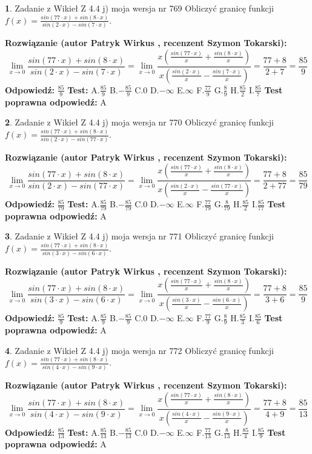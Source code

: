 \documentclass[12pt, a4paper]{article}
\theoremstyle{definition} %
\newtheorem{zad}{}
\newcommand{\zadStart}[1]{\begin{zad}#1\newline}
\newcommand{\zadStop}{\end{zad}}
\newcommand{\rozwStart}[2]{\noindent \textbf{Rozwiązanie (autor #1 , recenzent #2): }\newline}
\newcommand{\rozwStop}{\newline}
\newcommand{\odpStart}{\noindent \textbf{Odpowiedź:}\newline}
\newcommand{\odpStop}{\newline}
\newcommand{\testStart}{\noindent \textbf{Test:}\newline}
\newcommand{\testStop}{\newline}
\newcommand{\kluczStart}{\noindent \textbf{Test poprawna odpowiedź:}\newline}
\newcommand{\kluczStop}{\newline}
\begin{document}
\zadStart{Zadanie z Wikieł Z 4.4 j) moja wersja nr 769}
Obliczyć granicę funkcji $f(x)=\frac{sin(77\cdot x) +sin(8\cdot x)}{sin(2\cdot x) -sin(7\cdot x)}$.
\zadStop
\rozwStart{Patryk Wirkus}{Szymon Tokarski}
$$\lim\limits_{x\to 0}\frac{sin(77\cdot x) +sin(8\cdot x)}{sin(2\cdot x) -sin(7\cdot x)}=\lim\limits_{x\to 0}\frac{x(\frac{sin(77\cdot x)}{x}+\frac{sin(8\cdot x)}{x})}{x(\frac{sin(2\cdot x)}{x}-\frac{sin(7\cdot x)}{x})}=\frac{77+8}{2+7} = \frac{85}{9}$$
\rozwStop
\odpStart
$\frac{85}{9}$
\odpStop
\testStart
A.$\frac{85}{9}$
B.$-\frac{85}{9}$
C.$0$
D.$-\infty$
E.$\infty$
F.$\frac{77}{9}$
G.$\frac{8}{9}$
H.$\frac{85}{2}$
I.$\frac{85}{7}$
\testStop
\kluczStart
A
\kluczStop



\zadStart{Zadanie z Wikieł Z 4.4 j) moja wersja nr 770}
Obliczyć granicę funkcji $f(x)=\frac{sin(77\cdot x) +sin(8\cdot x)}{sin(2\cdot x) -sin(77\cdot x)}$.
\zadStop
\rozwStart{Patryk Wirkus}{Szymon Tokarski}
$$\lim\limits_{x\to 0}\frac{sin(77\cdot x) +sin(8\cdot x)}{sin(2\cdot x) -sin(77\cdot x)}=\lim\limits_{x\to 0}\frac{x(\frac{sin(77\cdot x)}{x}+\frac{sin(8\cdot x)}{x})}{x(\frac{sin(2\cdot x)}{x}-\frac{sin(77\cdot x)}{x})}=\frac{77+8}{2+77} = \frac{85}{79}$$
\rozwStop
\odpStart
$\frac{85}{79}$
\odpStop
\testStart
A.$\frac{85}{79}$
B.$-\frac{85}{79}$
C.$0$
D.$-\infty$
E.$\infty$
F.$\frac{77}{79}$
G.$\frac{8}{79}$
H.$\frac{85}{2}$
I.$\frac{85}{77}$
\testStop
\kluczStart
A
\kluczStop



\zadStart{Zadanie z Wikieł Z 4.4 j) moja wersja nr 771}
Obliczyć granicę funkcji $f(x)=\frac{sin(77\cdot x) +sin(8\cdot x)}{sin(3\cdot x) -sin(6\cdot x)}$.
\zadStop
\rozwStart{Patryk Wirkus}{Szymon Tokarski}
$$\lim\limits_{x\to 0}\frac{sin(77\cdot x) +sin(8\cdot x)}{sin(3\cdot x) -sin(6\cdot x)}=\lim\limits_{x\to 0}\frac{x(\frac{sin(77\cdot x)}{x}+\frac{sin(8\cdot x)}{x})}{x(\frac{sin(3\cdot x)}{x}-\frac{sin(6\cdot x)}{x})}=\frac{77+8}{3+6} = \frac{85}{9}$$
\rozwStop
\odpStart
$\frac{85}{9}$
\odpStop
\testStart
A.$\frac{85}{9}$
B.$-\frac{85}{9}$
C.$0$
D.$-\infty$
E.$\infty$
F.$\frac{77}{9}$
G.$\frac{8}{9}$
H.$\frac{85}{3}$
I.$\frac{85}{6}$
\testStop
\kluczStart
A
\kluczStop



\zadStart{Zadanie z Wikieł Z 4.4 j) moja wersja nr 772}
Obliczyć granicę funkcji $f(x)=\frac{sin(77\cdot x) +sin(8\cdot x)}{sin(4\cdot x) -sin(9\cdot x)}$.
\zadStop
\rozwStart{Patryk Wirkus}{Szymon Tokarski}
$$\lim\limits_{x\to 0}\frac{sin(77\cdot x) +sin(8\cdot x)}{sin(4\cdot x) -sin(9\cdot x)}=\lim\limits_{x\to 0}\frac{x(\frac{sin(77\cdot x)}{x}+\frac{sin(8\cdot x)}{x})}{x(\frac{sin(4\cdot x)}{x}-\frac{sin(9\cdot x)}{x})}=\frac{77+8}{4+9} = \frac{85}{13}$$
\rozwStop
\odpStart
$\frac{85}{13}$
\odpStop
\testStart
A.$\frac{85}{13}$
B.$-\frac{85}{13}$
C.$0$
D.$-\infty$
E.$\infty$
F.$\frac{77}{13}$
G.$\frac{8}{13}$
H.$\frac{85}{4}$
I.$\frac{85}{9}$
\testStop
\kluczStart
A
\kluczStop
\end{document}
